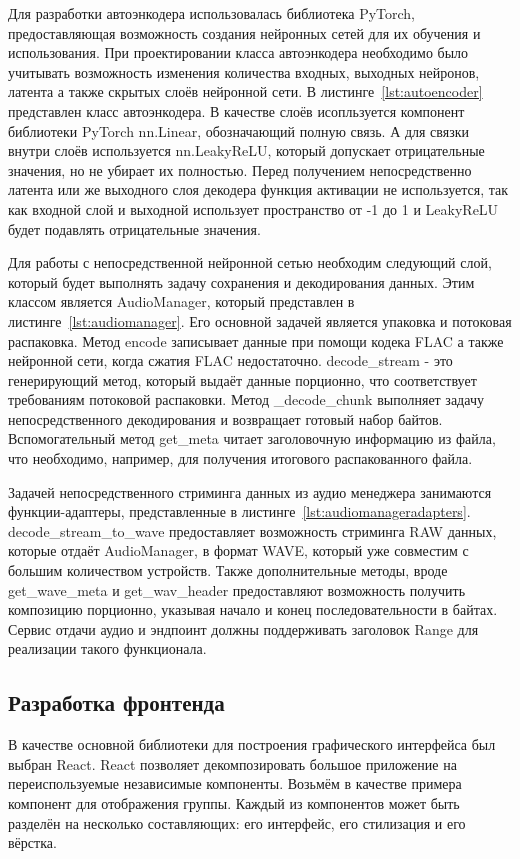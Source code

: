 \documentclass[14pt]{extarticle}
\begin{document}
Для разработки автоэнкодера использовалась библиотека PyTorch, предоставляющая возможность создания
нейронных сетей для их обучения и использования. При проектировании класса автоэнкодера необходимо было учитывать
возможность изменения количества входных, выходных нейронов, латента а также скрытых слоёв нейронной сети. 
В листинге~\ref{lst:autoencoder} представлен класс автоэнкодера. В качестве слоёв исопльзуется компонент библиотеки
PyTorch nn.Linear, обозначающий полную связь. А для связки внутри слоёв используется nn.LeakyReLU, который допускает
отрицательные значения, но не убирает их полностью. Перед получением непосредственно латента или же 
выходного слоя декодера функция активации не используется, так как входной слой и выходной использует пространство
от -1 до 1 и LeakyReLU будет подавлять отрицательные значения. 

Для работы с непосредственной нейронной сетью необходим следующий слой, который будет выполнять задачу
сохранения и декодирования данных. Этим классом является AudioManager, который представлен в листинге~\ref{lst:audiomanager}.
Его основной задачей является упаковка и потоковая распаковка. Метод encode записывает данные
при помощи кодека FLAC а также нейронной сети, когда сжатия FLAC недостаточно. decode\_stream - это
генерирующий метод, который выдаёт данные порционно, что соответствует требованиям потоковой распаковки. 
Метод \_decode\_chunk выполняет задачу непосредственного декодирования и возвращает готовый набор байтов. 
Вспомогательный метод get\_meta читает заголовочную информацию из файла, что необходимо, например, для 
получения итогового распакованного файла. 

Задачей непосредственного стриминга данных из аудио менеджера занимаются функции-адаптеры, представленные 
в листинге~\ref{lst:audiomanageradapters}. decode\_stream\_to\_wave предоставляет возможность стриминга RAW
данных, которые отдаёт AudioManager, в формат WAVE, который уже совместим с большим количеством устройств. Также
дополнительные методы, вроде get\_wave\_meta и get\_wav\_header предоставляют возможность получить композицию порционно, 
указывая начало и конец последовательности в байтах. Сервис отдачи аудио и эндпоинт должны поддерживать
заголовок Range для реализации такого функционала.

\subsection{Разработка фронтенда}

В качестве основной библиотеки для построения графического интерфейса был выбран React. React позволяет декомпозировать большое приложение 
на переиспользуемые независимые компоненты. Возьмём в качестве примера компонент для отображения группы. 
Каждый из компонентов может быть разделён на несколько составляющих: его интерфейс, его стилизация и его вёрстка. 
\end{document}
